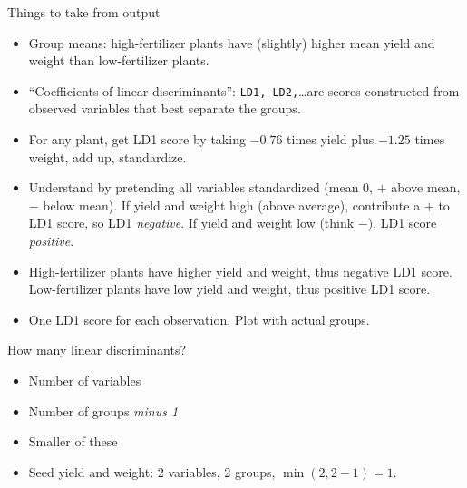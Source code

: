 \documentclass[ignorenonframetext,]{beamer}
\begin{document}
\begin{frame}{Things to take from output}
\protect\hypertarget{things-to-take-from-output}{}

\begin{itemize}
\item
  Group means: high-fertilizer plants have (slightly) higher mean yield
  and weight than low-fertilizer plants.
\item
  ``Coefficients of linear discriminants'': \texttt{LD1,
  LD2,}\ldots are scores constructed from observed variables that best
  separate the groups.
\item
  For any plant, get LD1 score by taking \(-0.76\) times yield plus
  \(-1.25\) times weight, add up, standardize.
\item
  Understand by pretending all variables standardized (mean 0, \(+\)
  above mean, \(-\) below mean). If yield and weight high (above
  average), contribute a \(+\) to LD1 score, so LD1 \emph{negative}. If
  yield and weight low (think \(-\)), LD1 score \emph{positive}.
\item
  High-fertilizer plants have higher yield and weight, thus negative LD1
  score. Low-fertilizer plants have low yield and weight, thus positive
  LD1 score.
\item
  One LD1 score for each observation. Plot with actual groups.
\end{itemize}

\end{frame}

\begin{frame}{How many linear discriminants?}
\protect\hypertarget{how-many-linear-discriminants}{}

\begin{itemize}
\item
  Number of variables
\item
  Number of groups \emph{minus 1}
\item
  Smaller of these
\item
  Seed yield and weight: 2 variables, 2 groups, \(\min(2,2-1)=1\).
\end{itemize}

\end{frame}
\end{document}

